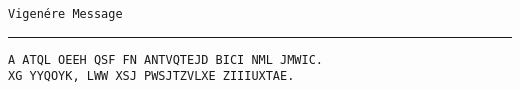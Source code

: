 
\begin{minipage}{\textwidth}
\begin{center} {\tt Vigen\'ere Message} \end{center}
\hrule
\begin{center}
\Large
\begin{verbatim}
A ATQL OEEH QSF FN ANTVQTEJD BICI NML JMWIC.
XG YYQOYK, LWW XSJ PWSJTZVLXE ZIIIUXTAE.
\end{verbatim}
\end{center}
\end{minipage}
